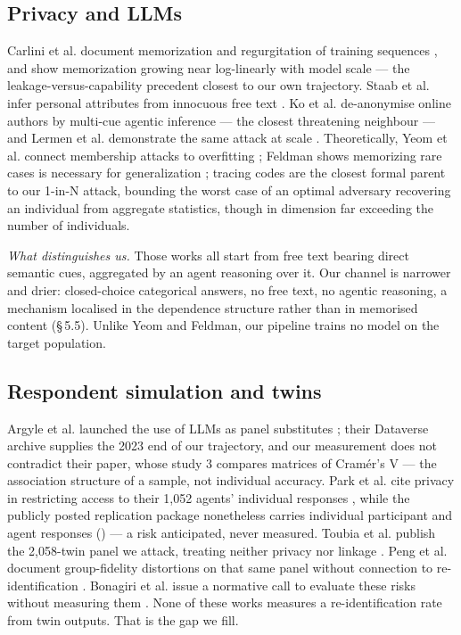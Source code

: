 \documentclass[sigconf,anonymous,review]{acmart}
\begin{document}
\subsection{Privacy and LLMs}

Carlini et al. document memorization and regurgitation of training sequences \cite{carlini2021extracting}, and show memorization growing near log-linearly with model scale \cite{carlini2023quantifying} --- the leakage-versus-capability precedent closest to our own trajectory. Staab et al. infer personal attributes from innocuous free text \cite{staab2024beyond}. Ko et al. de-anonymise online authors by multi-cue agentic inference \cite{ko2026weakcues} --- the closest threatening neighbour --- and Lermen et al. demonstrate the same attack at scale \cite{lermen2026deanonymization}. Theoretically, Yeom et al. connect membership attacks to overfitting \cite{yeom2018privacy}; Feldman shows memorizing rare cases is necessary for generalization \cite{feldman2020memorization}; tracing codes \cite{bun2014fingerprinting,dwork2015robust} are the closest formal parent to our 1-in-N attack, bounding the worst case of an optimal adversary recovering an individual from aggregate statistics, though in dimension far exceeding the number of individuals.

\textit{What distinguishes us.} Those works all start from free text bearing direct semantic cues, aggregated by an agent reasoning over it. Our channel is narrower and drier: closed-choice categorical answers, no free text, no agentic reasoning, a mechanism localised in the dependence structure rather than in memorised content (\S\,5.5). Unlike Yeom and Feldman, our pipeline trains no model on the target population.

\subsection{Respondent simulation and twins}

Argyle et al. launched the use of LLMs as panel substitutes \cite{argyle2023outofone}; their Dataverse archive supplies the 2023 end of our trajectory, and our measurement does not contradict their paper, whose study 3 compares matrices of Cramér's V --- the association structure of a sample, not individual accuracy. Park et al. cite privacy in restricting access to their 1,052 agents' individual responses \cite{park2024agents}, while the publicly posted replication package nonetheless carries individual participant and agent responses (\ethicsname{}) --- a risk anticipated, never measured. Toubia et al. publish the 2,058-twin panel we attack, treating neither privacy nor linkage \cite{toubia2025twin2k500}. Peng et al. document group-fidelity distortions on that same panel without connection to re-identification \cite{peng2026funhouse}. Bonagiri et al. issue a normative call to evaluate these risks without measuring them \cite{bonagiri2026cognitive}. None of these works measures a re-identification rate from twin outputs. That is the gap we fill.
\end{document}
